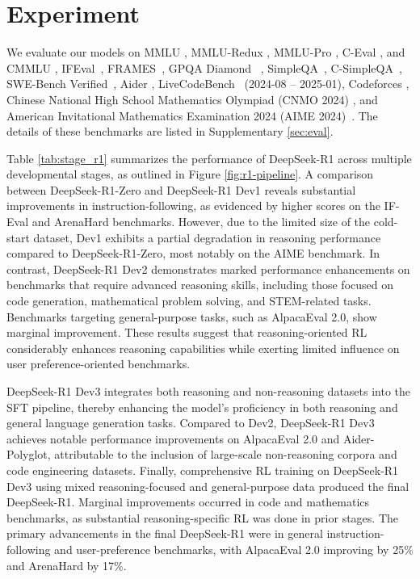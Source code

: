 \section{Experiment}

 We evaluate our models on MMLU \citep{mmlu}, MMLU-Redux \citep{mmlu_redux}, MMLU-Pro \citep{mmlu_pro}, C-Eval \citep{ceval}, and CMMLU \citep{cmmlu}, IFEval~\citep{IFeval}, FRAMES~\citep{frames}, GPQA Diamond ~\citep{gpqa}, SimpleQA~\citep{simpleqa}, C-SimpleQA~\citep{csimpleqa}, SWE-Bench Verified~\citep{swe_verified}, Aider \citep{aider}, LiveCodeBench~\citep{livecodebench} (2024-08 -- 2025-01), Codeforces \citep{codeforces}, Chinese National High School Mathematics Olympiad (CNMO 2024) \citep{cnmo}, and American Invitational Mathematics Examination 2024 (AIME 2024)~\citep{AIME2024}. The details of these benchmarks are listed in Supplementary \ref{sec:eval}. 

Table \ref{tab:stage_r1} summarizes the performance of DeepSeek-R1 across multiple developmental stages, as outlined in Figure \ref{fig:r1-pipeline}. A comparison between DeepSeek-R1-Zero and DeepSeek-R1 Dev1 reveals substantial improvements in instruction-following, as evidenced by higher scores on the IF-Eval and ArenaHard benchmarks. However, due to the limited size of the cold-start dataset, Dev1 exhibits a partial degradation in reasoning performance compared to DeepSeek-R1-Zero, most notably on the AIME benchmark. In contrast, DeepSeek-R1 Dev2 demonstrates marked performance enhancements on benchmarks that require advanced reasoning skills, including those focused on code generation, mathematical problem solving, and STEM-related tasks. Benchmarks targeting general-purpose tasks, such as AlpacaEval 2.0, show marginal improvement. These results suggest that reasoning-oriented RL considerably enhances reasoning capabilities while exerting limited influence on user preference-oriented benchmarks.

 DeepSeek-R1 Dev3 integrates both reasoning and non-reasoning datasets into the SFT pipeline, thereby enhancing the model’s proficiency in both reasoning and general language generation tasks. Compared to Dev2, DeepSeek-R1 Dev3 achieves notable performance improvements on AlpacaEval 2.0 and Aider-Polyglot, attributable to the inclusion of large-scale non-reasoning corpora and code engineering datasets. Finally, comprehensive RL training on DeepSeek-R1 Dev3 using mixed reasoning-focused and general-purpose data produced the final DeepSeek-R1. Marginal improvements occurred in code and mathematics benchmarks, as substantial reasoning-specific RL was done in prior stages. The primary advancements in the final DeepSeek-R1 were in general instruction-following and user-preference benchmarks, with AlpacaEval 2.0 improving by 25\% and ArenaHard by 17\%.

